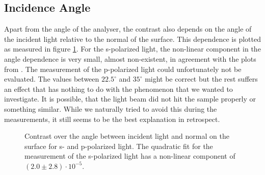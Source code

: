 \documentclass[a4paper]{scrartcl}
\numberwithin{equation}{section}
\numberwithin{figure}{section}
\numberwithin{table}{section}
\begin{document}
\subsection{Incidence Angle}
Apart from the angle of the analyser, the contrast also depends on the angle of the incident light relative to the normal of the surface. This dependence is plotted as measured in figure \ref{fig:inc}. For the s-polarized light, the non-linear component in the angle dependence is very small, almost non-existent, in agreement with the plots from \cite{paper}. The measurement of the p-polarized light could unfortunately not be evaluated. The values between $22.5^\circ$ and $35^\circ$ might be correct but the rest suffers an effect that has nothing to do with the phenomenon that we wanted to investigate. It is possible, that the light beam did not hit the sample properly or something similar. While we naturally tried to avoid this during the measurements, it still seems to be the best explanation in retrospect.
\begin{figure} 
 \centering
{}

\caption{
\small Contrast over the angle between incident light and normal on the surface for s- and p-polarized light. The quadratic fit for the measurement of the s-polarized light has a non-linear component of $(2.0\pm2.8)\cdot 10^{-5}$. } 
	\label{fig:inc}
\end{figure}



 

\end{document}
